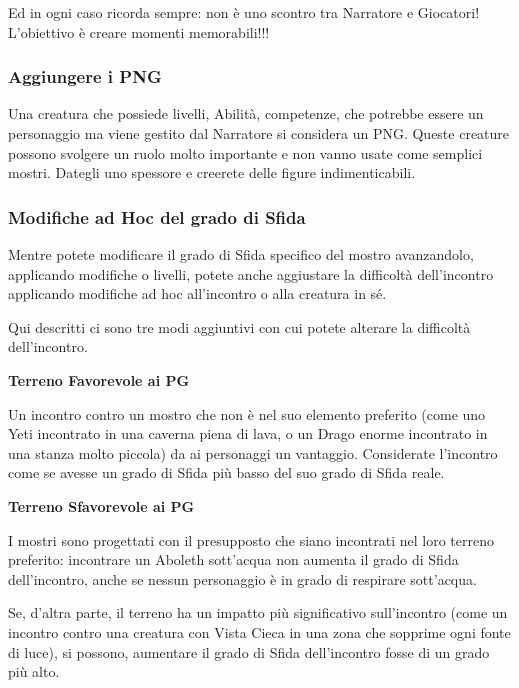 \begin{multicols}{2}
Ed in ogni caso ricorda sempre: non è uno scontro tra Narratore e Giocatori! L'obiettivo è creare momenti memorabili!!!

\subsubsection{Aggiungere i PNG}

Una creatura che possiede livelli, Abilità, competenze, che potrebbe essere un personaggio ma viene gestito dal Narratore si considera un PNG. Queste creature possono svolgere un ruolo molto importante e non vanno usate come semplici mostri. Dategli uno spessore e creerete delle figure indimenticabili.

\subsubsection{Modifiche ad Hoc del grado di Sfida}

Mentre potete modificare il grado di Sfida specifico del mostro avanzandolo, applicando modifiche o livelli, potete anche aggiustare la difficoltà dell'incontro applicando modifiche ad hoc all'incontro o alla creatura in sé.

Qui descritti ci sono tre modi aggiuntivi con cui potete alterare la difficoltà dell'incontro.

\medskip

\textbf{Terreno Favorevole ai PG}

Un incontro contro un mostro che non è nel suo elemento preferito (come uno Yeti incontrato in una caverna piena di lava, o un Drago enorme incontrato in una stanza molto piccola) da ai personaggi un vantaggio. Considerate l'incontro come se avesse un grado di Sfida più basso del suo grado di Sfida reale.

\medskip

\textbf{Terreno Sfavorevole ai PG}

I mostri sono progettati con il presupposto che siano incontrati nel loro terreno preferito: incontrare un Aboleth sott'acqua non aumenta il grado di Sfida dell'incontro, anche se nessun personaggio è in grado di respirare sott'acqua.

Se, d'altra parte, il terreno ha un impatto più significativo sull'incontro (come un incontro contro una creatura con Vista Cieca in una zona che sopprime ogni fonte di luce), si possono, aumentare il grado di Sfida dell'incontro fosse di un grado più alto.


\end{multicols}
